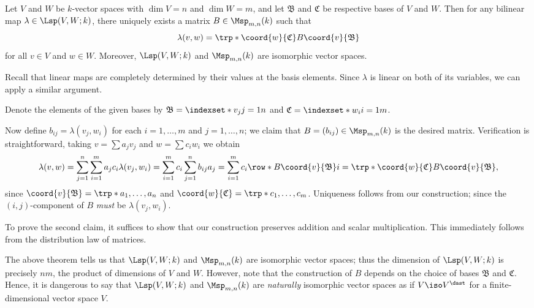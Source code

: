 \begin{theorem}
    \label{thm:blnrep}
    Let \(V\) and \(W\) be \(k\)-vector spaces
    with \(\dim V=n\) and \(\dim W=m\),
    and let \(\mathfrak B\) and \(\mathfrak C\) be respective bases
    of \(V\) and \(W\).
    Then for any bilinear map \(\lambda\in\Lsp(V,W;k)\),
    there uniquely exists a matrix \(B\in\Msp_{m,n}(k)\) such that
    \[
        \lambda(v,w)
        =\trp*{\coord{w}{\mathfrak C}}B\coord{v}{\mathfrak B}
    \]
    for all \(v\in V\) and \(w\in W\).
    Moreover,
    \(\Lsp(V,W;k)\) and \(\Msp_{m,n}(k)\) are isomorphic vector spaces.
\end{theorem}
\begin{sketch}
    Recall that
    linear maps are completely determined by their values
    at the basis elements.
    Since \(\lambda\) is linear on both of its variables,
    we can apply a similar argument.
\end{sketch}
\begin{myproof}
    Denote the elements of the given bases by
    \(\mathfrak B=\indexset*{v_j}{j=1}{n}\)
    and \(\mathfrak C=\indexset*{w_i}{i=1}{m}\).
    
    Now define \(b_{ij}=\lambda(v_j,w_i)\)
    for each \(i=1,\dots,m\) and \(j=1,\dots,n\);
    we claim that \(B=(b_{ij})\in\Msp_{m,n}(k)\) is the desired matrix.
    Verification is straightforward,
    taking \(v=\sum a_jv_j\) and \(w=\sum c_iw_i\) we obtain
    \begin{align*}
        \lambda(v,w)
        =\sum_{j=1}^{n}\sum_{i=1}^{m}a_jc_i\lambda(v_j,w_i)
        =\sum_{i=1}^{m}c_i\sum_{j=1}^{n}b_{ij}a_j
        =\sum_{i=1}^{m}c_i\row*{B\coord{v}{\mathfrak B}}{i}
        =\trp*{\coord{w}{\mathfrak C}}B\coord{v}{\mathfrak B},
    \end{align*}
    since \(\coord{v}{\mathfrak B}=\trp*{a_1,\dots,a_n}\)
    and \(\coord{w}{\mathfrak C}=\trp*{c_1,\dots,c_m}\).
    Uniqueness follows from our construction;
    since the \((i,j)\)-component of \(B\)
    \emph{must} be \(\lambda(v_j,w_i)\).

    To prove the second claim, it suffices to show that
    our construction preserves addition and scalar multiplication.
    This immediately follows from the distribution law of matrices.
\end{myproof}
\begin{remark}
    \label{rmk:blnrep}
    The above theorem tells us that
    \(\Lsp(V,W;k)\) and \(\Msp_{m,n}(k)\)
    are isomorphic vector spaces;
    thus the dimension of \(\Lsp(V,W;k)\) is precisely \(nm\),
    the product of dimensions of \(V\) and \(W\).
    However, note that the construction of \(B\) depends on
    the choice of bases \(\mathfrak B\) and \(\mathfrak C\).
    Hence, it is dangerous to say that
    \(\Lsp(V,W;k)\) and \(\Msp_{m,n}(k)\) are
    \emph{naturally} isomorphic vector spaces
    as if \(V\iso V^{\dast}\) for
    a finite-dimensional vector space \(V\).
\end{remark}